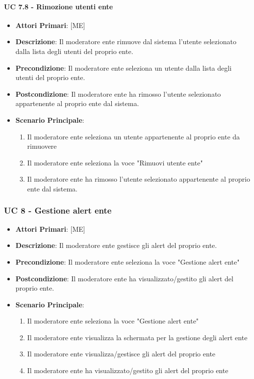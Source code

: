 			\paragraph{UC 7.8 - Rimozione utenti ente}
			\begin{itemize}
				\item \textbf{Attori Primari}: [ME]
				\item \textbf{Descrizione}: Il moderatore ente rimuove dal sistema l'utente selezionato dalla lista degli utenti del proprio ente.
				\item \textbf{Precondizione}: Il moderatore ente seleziona un utente dalla lista degli utenti del proprio ente.
				\item \textbf{Postcondizione}: Il moderatore ente ha rimosso l'utente selezionato appartenente al proprio ente dal sistema.
				\item \textbf{Scenario Principale}:
				\begin{enumerate}
					\item{Il moderatore ente seleziona un utente appartenente al proprio ente da rimuovere}
					\item{Il moderatore ente seleziona la voce "Rimuovi utente ente"}
					\item{Il moderatore ente ha rimosso l'utente selezionato appartenente al proprio ente dal sistema.}
				\end{enumerate}		
			\end{itemize}

		\subsubsection{UC 8 - Gestione alert ente}
		
		
		
		\begin{itemize}
			\item \textbf{Attori Primari}: [ME]
			\item \textbf{Descrizione}: Il moderatore ente gestisce gli alert del proprio ente.
			\item \textbf{Precondizione}: Il moderatore ente seleziona la voce "Gestione alert ente"
			\item \textbf{Postcondizione}: Il moderatore ente ha visualizzato/gestito gli alert del proprio ente.
			\item \textbf{Scenario Principale}:
			\begin{enumerate}
				\item{Il moderatore ente seleziona la voce "Gestione alert ente"}
				\item{Il moderatore ente visualizza la schermata per la gestione degli alert ente}
				\item{Il moderatore ente visualizza/gestisce gli alert del proprio ente}
				\item{Il moderatore ente ha visualizzato/gestito gli alert del proprio ente}
			\end{enumerate}	
		\end{itemize}
			

